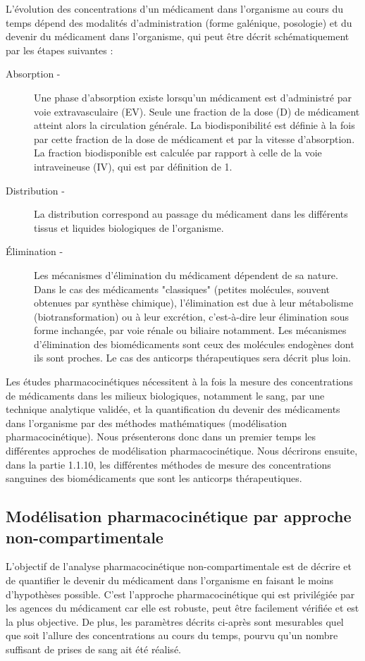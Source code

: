 L'évolution des concentrations d'un médicament dans l'organisme au cours du temps dépend des modalités d'administration (forme galénique, posologie) et du devenir du médicament dans l'organisme, qui peut être décrit schématiquement par les étapes suivantes :
\begin{description}
\item[Absorption -] Une phase d'absorption existe lorsqu'un médicament est d'administré par voie extravasculaire (\gls{EV}). Seule une fraction de la dose (D) de médicament atteint alors la circulation générale. La biodisponibilité est définie à la fois par cette fraction de la dose de médicament et par la vitesse d'absorption. La fraction biodisponible est calculée par rapport à celle de la voie intraveineuse (\gls{IV}), qui est par définition de 1.
\item[Distribution -] La distribution correspond au passage du médicament dans les différents tissus et liquides biologiques de l'organisme.
\item[Élimination -] Les mécanismes d'élimination du médicament dépendent de sa nature. Dans le cas des médicaments "classiques" (petites molécules, souvent obtenues par synthèse chimique), l'élimination est due à leur métabolisme (biotransformation) ou à leur excrétion, c'est-à-dire leur élimination sous forme inchangée, par voie rénale ou biliaire notamment. Les mécanismes d'élimination des biomédicaments sont ceux des molécules endogènes dont ils sont proches. Le cas des anticorps thérapeutiques sera décrit plus loin.
\end{description}

Les études pharmacocinétiques nécessitent à la fois la mesure des concentrations de médicaments dans les milieux biologiques, notamment le sang, par une technique analytique validée, et la quantification du devenir des médicaments dans l'organisme par des méthodes mathématiques (modélisation pharmacocinétique). Nous présenterons donc dans un premier temps les différentes approches de modélisation pharmacocinétique. Nous décrirons ensuite, dans la partie 1.1.10, les différentes méthodes de mesure des concentrations sanguines des biomédicaments que sont les anticorps thérapeutiques.

\subsection{Modélisation pharmacocinétique par approche non-compartimentale}
L'objectif de l'analyse pharmacocinétique non-compartimentale est de décrire et de quantifier le devenir du médicament dans l'organisme en faisant le moins d'hypothèses possible. C'est l'approche pharmacocinétique qui est privilégiée par les agences du médicament car elle est robuste, peut être facilement vérifiée et est la plus objective. De plus, les paramètres décrits ci-après sont mesurables quel que soit l'allure des concentrations au cours du temps, pourvu qu'un nombre suffisant de prises de sang ait été réalisé.

